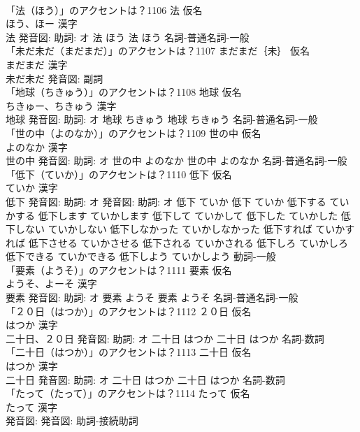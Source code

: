 \documentclass[8pt]{extreport}
\begin{document}
\begin{CJK}{UTF8}{min}
\\	「法（ほう）」のアクセントは？1106	法 仮名　
\\	ほう、ほー 漢字　
\\	法 発音図: 助詞: オ	法 ほう		法 ほう				名詞-普通名詞-一般 
\\	「未だ未だ（まだまだ）」のアクセントは？1107	まだまだ｛未｝ 仮名　
\\	まだまだ 漢字　
\\	未だ未だ 発音図:							副詞 
\\	「地球（ちきゅう）」のアクセントは？1108	地球 仮名　
\\	ちきゅー、ちきゅう 漢字　
\\	地球 発音図: 助詞: オ	地球 ちきゅう		地球 ちきゅう				名詞-普通名詞-一般 
\\	「世の中（よのなか）」のアクセントは？1109	世の中 仮名　
\\	よのなか 漢字　
\\	世の中 発音図: 助詞: オ	世の中 よのなか		世の中 よのなか				名詞-普通名詞-一般 
\\	「低下（ていか）」のアクセントは？1110	低下 仮名　
\\	ていか 漢字　
\\	低下 発音図: 助詞: オ 発音図: 助詞: オ	低下 ていか		低下 ていか 低下する ていかする 低下します ていかします 低下して ていかして 低下した ていかした 低下しない ていかしない 低下しなかった ていかしなかった 低下すれば ていかすれば 低下させる ていかさせる 低下される ていかされる 低下しろ ていかしろ 低下できる ていかできる 低下しよう ていかしよう				動詞-一般 
\\	「要素（ようそ）」のアクセントは？1111	要素 仮名　
\\	ようそ、よーそ 漢字　
\\	要素 発音図: 助詞: オ	要素 ようそ		要素 ようそ				名詞-普通名詞-一般 
\\	「２０日（はつか）」のアクセントは？1112	２０日 仮名　
\\	はつか 漢字　
\\	二十日、２０日 発音図: 助詞: オ	二十日 はつか		二十日 はつか				名詞-数詞 
\\	「二十日（はつか）」のアクセントは？1113	二十日 仮名　
\\	はつか 漢字　
\\	二十日 発音図: 助詞: オ	二十日 はつか		二十日 はつか				名詞-数詞 
\\	「たって（たって）」のアクセントは？1114	たって 仮名　
\\	たって 漢字　
\\	発音図: 発音図:							助詞-接続助詞 

\end{CJK}
\end{document}
